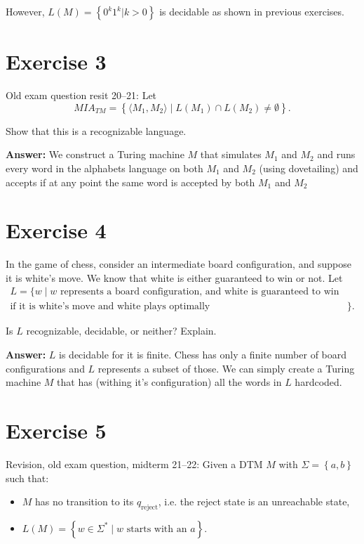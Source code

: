 \documentclass[a4paper,11pt]{article}
\newcommand{\Alphabet}{\Sigma}
\newcommand{\set}[1]{\left\{ #1 \right\}}
\begin{document}
	However, $L(M) = \set{0^k1^k | k>0}$ is decidable as shown in previous exercises.

	\section{Exercise 3}
	Old exam question resit 20--21: Let
	\[
	MIA_{TM} = \set{\langle M_1, M_2\rangle \mid L(M_1)\cap L(M_2)\neq \emptyset}.
	\]

	Show that this is a recognizable language.

	\textbf{Answer: }We construct a Turing machine $M$ that simulates $M_1$ and $M_2$ and runs every word in the alphabets language on both $M_1$ and $M_2$ (using dovetailing) and accepts if at any point the same word is accepted by both $M_1$ and $M_2$
	\vspace{1cm}

	\section{Exercise 4}
	In the game of chess, consider an intermediate board configuration, and suppose it is white's move. We know that white is either guaranteed to win or not. Let
	\begin{align*}
		L = \{w \mid w \text{ represents a board configuration, and white is guaranteed to win}&\\
		\text{if it is white's move and white plays optimally}&\}.
	\end{align*}


	Is $L$ recognizable, decidable, or neither? Explain.

	\textbf{Answer: }$L$ is decidable for it is finite. Chess has only a finite number of board configurations and $L$ represents a subset of those. We can simply create a Turing machine $M$ that has (withing it's configuration) all the words in $L$ hardcoded.

	\section{Exercise 5}
	Revision, old exam question, midterm 21--22: Given a DTM $M$ with $\Alphabet = \set{a,b}$ such that:
	\begin{itemize}
		\item $M$ has no transition to its $q_{\mathrm{reject}}$, i.e. the reject state is an unreachable state,
		\item $L(M) = \set{w \in \Alphabet^* \mid w \text{ starts with an } a}$.
	\end{itemize}
\end{document}
